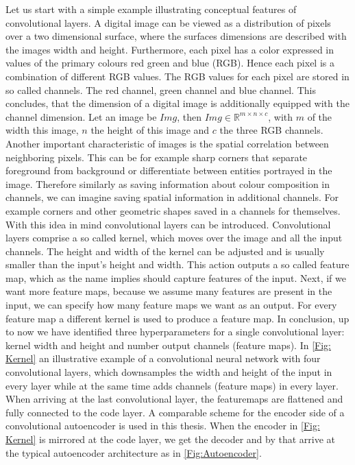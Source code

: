 Let us start with a simple example illustrating conceptual features of convolutional layers. A digital image can be viewed as a distribution of pixels over a two dimensional surface, where the surfaces dimensions are described with the images width and height. Furthermore, each pixel has a color expressed in values of the primary colours red green and blue (RGB). Hence each pixel is a combination of different RGB values. The RGB values for each pixel are stored in so called channels. The red channel, green channel and blue channel. This concludes, that the dimension of a digital image is additionally equipped with the channel dimension. Let an image be \(Img\), then  \(Img \in \mathbb{R}^{m\times n\times c}\), with \(m\) of the width this image, \(n\) the height of this image and \(c\) the three RGB channels. Another important characteristic of images is the spatial correlation between neighboring pixels. This can be for example sharp corners that separate foreground from background or differentiate between entities portrayed in the image. Therefore similarly as saving information about colour composition in channels, we can imagine saving spatial information in additional channels. For example corners and other geometric shapes saved in a channels for themselves. With this idea in mind convolutional layers can be introduced. Convolutional layers comprise a so called kernel, which moves over the image and all the input channels. The height and width of the kernel can be adjusted and is usually smaller than the input's height and width. This action outputs a so called feature map, which as the name implies should capture features of the input. Next, if we want more feature maps, because we assume many features are present in the input, we can specify how many feature maps we want as an output. For every feature map a different kernel is used to produce a feature map. In conclusion, up to now we have identified three hyperparameters for a single convolutional layer: kernel width and height and number output channels (feature maps). In \cref{Fig: Kernel} an illustrative example of a convolutional neural network with four convolutional layers, which downsamples the width and height of the input in every layer while at the same time adds channels (feature maps) in every layer. When arriving at the last convolutional layer, the featuremaps are flattened and fully connected to the code layer. A comparable scheme for the encoder side of a convolutional autoencoder is used in this thesis. When the encoder in \cref{Fig: Kernel} is mirrored at the code layer, we get the decoder and by that arrive at the typical autoencoder architecture as in \cref{Fig:Autoencoder}.
